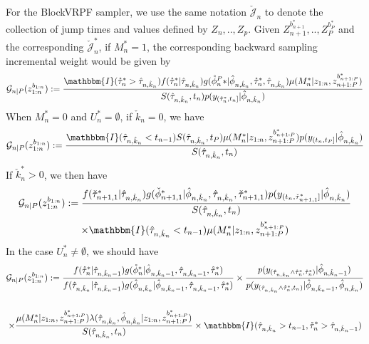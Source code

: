 \documentclass[12pt,a4paper]{article}
\begin{document}
For the BlockVRPF sampler, we use the same notation $\check{\mathcal{J}}_{n}$ to denote the collection of jump times and values defined by \(Z_{n},..,Z_p\). Given $Z_{n+1}^{b_{n+1}^{*}},..,Z_{P}^{b_{P}^{*}}$ and the corresponding $\check{\mathcal{J}}_{n}^{*}$, if $M_{n}^{*} = 1$, the corresponding backward sampling incremental weight would be given by 
\begin{equation}
    \label{PMCMC - BlockVRPF Backward Simulation Weight 1}
    \mathcal{G}_{n|P}(z_{1:n}^{b_{1:n}}) := \frac{\mathbbm{I}(\mathring{\tau}_n^{*}>\hat{\tau}_{n,\hat{k}_n})f(\mathring{\tau}_n^{*}|\hat{\tau}_{n,\hat{k}_n})g(\mathring{\phi}_n^P{*}|\hat{\phi}_{n,\hat{k}_n},\mathring{\tau}_n^{*},\hat{\tau}_{n,\hat{k}_n})\mu(M_n^{*}|z_{1:n},z_{n+1:P}^{b_{n+1:P}^*})}{S(\hat{\tau}_{n,\hat{k}_n},t_n)p(y_{(\mathring{\tau}_n^{*},t_n]}|\hat{\phi}_{n,\hat{k}_n})}
\end{equation}
When $M_n^{*} = 0$ and $U_n^{*} = \emptyset$, if $\check{k}_n = 0$, we have 
\begin{equation}
    \label{PMCMC - BlockVRPF Backward Simulation Weight 2}
    \mathcal{G}_{n|P}(z_{1:n}^{b_{1:n}}) := \frac{\mathbbm{I}(\hat{\tau}_{n,\hat{k}_n} < t_{n-1})S(\hat{\tau}_{n,\hat{k}_n},t_P)\mu(M_n^{*}|z_{1:n},z_{n+1:P}^{b_{n+1:P}^*})p(y_{(t_n,t_P]}|\hat{\phi}_{n,\hat{k}_n})}{S(\hat{\tau}_{n,\hat{k}_n},t_n)}
\end{equation}
If $\check{k}_n^{*} > 0$, we then have 
\begin{multline}
    \label{PMCMC - BlockVRPF Backward Simulation Weight 3}
    \mathcal{G}_{n|P}(z_{1:n}^{b_{1:n}}) := \frac{f(\check{\tau}_{n+1,1}^{*}|\hat{\tau}_{n,\hat{k}_n})g(\check{\phi}_{n+1,1}^{*}|\hat{\phi}_{n,\hat{k}_n},\hat{\tau}_{n,\hat{k}_n},\check{\tau}_{n+1,1}^{*})p(y_{(t_n,\check{\tau}_{n+1,1}^{*}]}|\hat{\phi}_{n,\hat{k}_n})}{S(\hat{\tau}_{n,\hat{k}_n},t_n)} \\
    \times \mathbbm{I}(\hat{\tau}_{n,\hat{k}_n} < t_{n-1})\mu(M_n^{*}|z_{1:n},z_{n+1:P}^{b_{n+1:P}^*})
\end{multline}
In the case \(U_n^{*} \neq \emptyset\), we should have 
\begin{multline}
    \label{PMCMC - BlockVRPF Backward Simulation Weight 4}
    \mathcal{G}_{n|P}(z_{1:n}^{b_{1:n}}) := \frac{f(\mathring{\tau}_n^{*}|\hat{\tau}_{n,\hat{k}_n-1})g(\mathring{\phi}_n^{*}|\hat{\phi}_{n,\hat{k}_{n}-1},\hat{\tau}_{n,\hat{k}_n-1},\mathring{\tau}_n^{*})}{f(\hat{\tau}_{n,\hat{k}_{n}}|\hat{\tau}_{n,\hat{k}_n-1})g(\hat{\phi}_{n,\hat{k}_{n}}|\hat{\phi}_{n,\hat{k}_{n}-1},\hat{\tau}_{n,\hat{k}_n-1},\mathring{\tau}_n^{*})}
    \times\frac{p(y_{(\hat{\tau}_{n,\hat{k}_n}\wedge \mathring{\tau}_n^{*},\mathring{\tau}_n^{*})}|\hat{\phi}_{n,\hat{k}_n-1})}{p(y_{(\hat{\tau}_{n,\hat{k}_n}\wedge \mathring{\tau}_n^{*},t_n)}|\hat{\phi}_{n,\hat{k}_n-1},\hat{\phi}_{n,\hat{k}_n})}\\\\
    \times \frac{\mu(M_n^{*}|z_{1:n},z_{n+1:P}^{b_{n+1:P}^*})\lambda(\hat{\tau}_{n,\hat{k}_{n}},\hat{\phi}_{n,\hat{k}_{n}}|z_{1:n},z_{n+1:P}^{b_{n+1:P}^*})}{S(\hat{\tau}_{n,\hat{k}_{n}},t_n)}\times\mathbbm{I}(\hat{\tau}_{n,\hat{k}_n}>t_{n-1},\mathring{\tau}_{n}^{*}>\hat{\tau}_{n,\hat{k}_n-1})
\end{multline}
\end{document}
